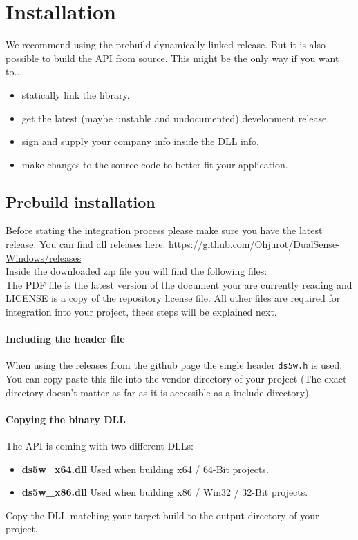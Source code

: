 \section{Installation}
We recommend using the prebuild dynamically linked release. But it is also possible to build the API from source. This might be the only way if you want to...
\begin{itemize}
	\item statically link the library.
	\item get the latest (maybe unstable and undocumented) development release.
	\item sign and supply your company info inside the DLL info.
	\item make changes to the source code to better fit your application.
\end{itemize}

\subsection{Prebuild installation}
Before stating the integration process please make sure you have the latest release. You can find all releases here: \url{https://github.com/Ohjurot/DualSense-Windows/releases}\\

Inside the downloaded zip file you will find the following files:
~\\

The PDF file is the latest version of the document your are currently reading and LICENSE is a copy of the repository license file. All other files are required for integration into your project, thees steps will be explained next.

\paragraph{Including the header file}
When using the releases from the github page the single header \texttt{ds5w.h} is used. You can copy paste this file into the vendor directory of your project (The exact directory doesn't matter as far as it is accessible as a include directory). 

\paragraph{Copying the binary DLL}
The API is coming with two different DLLs:
\begin{itemize}
	\item \textbf{ds5w\_x64.dll} Used when building x64 / 64-Bit projects.
	\item \textbf{ds5w\_x86.dll} Used when building x86 / Win32 / 32-Bit projects.
\end{itemize}
Copy the DLL matching your target build to the output directory of your project.


